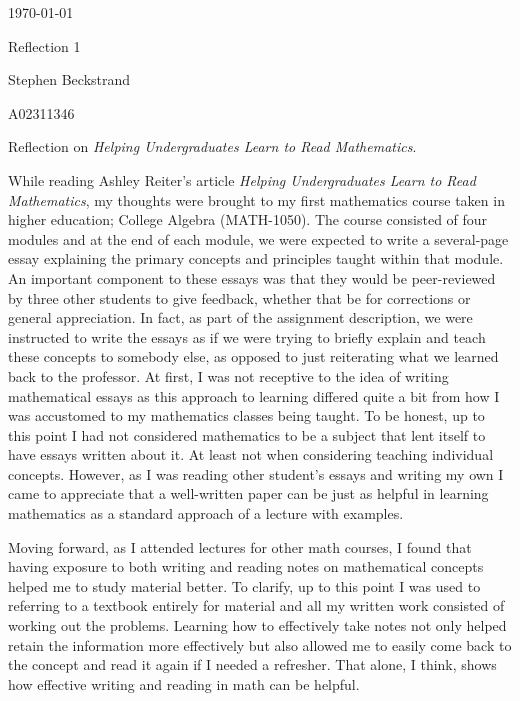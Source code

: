 \documentclass[12pt]{article}
\begin{document}
\thispagestyle{empty}
\raggedright

\hfill \today    %

\hfill Reflection 1  %

\hfill Stephen Beckstrand  %

\hfill A02311346 %

Reflection on \emph{Helping Undergraduates Learn to Read Mathematics}.  %

\vspace{1em}  %

\begin{flushleft}
While reading Ashley Reiter's article \emph{Helping Undergraduates Learn to Read Mathematics}, my thoughts were brought to my first mathematics course taken in higher education; College Algebra (MATH-1050). The course consisted of four modules and at the end of each module, we were expected to write a several-page essay explaining the primary concepts and principles taught within that module. An important component to these essays was that they would be peer-reviewed by three other students to give feedback, whether that be for corrections or general appreciation. In fact, as part of the assignment description, we were instructed to write the essays as if we were trying to briefly explain and teach these concepts to somebody else, as opposed to just reiterating what we learned back to the professor. At first, I was not receptive to the idea of writing mathematical essays as this approach to learning differed quite a bit from how I was accustomed to my mathematics classes being taught. To be honest, up to this point I had not considered mathematics to be a subject that lent itself to have essays written about it. At least not when considering teaching individual concepts. However, as I was reading other student's essays and writing my own I came to appreciate that a well-written paper can be just as helpful in learning mathematics as a standard approach of a lecture with examples.
\end{flushleft}

\begin{flushleft}
Moving forward, as I attended lectures for other math courses, I found that having exposure to both writing and reading notes on mathematical concepts helped me to study material better. To clarify, up to this point I was used to referring to a textbook entirely for material and all my written work consisted of working out the problems. Learning how to effectively take notes not only helped retain the information more effectively but also allowed me to easily come back to the concept and read it again if I needed a refresher. That alone, I think, shows how effective writing and reading in math can be helpful.
\end{flushleft}
\end{document}
